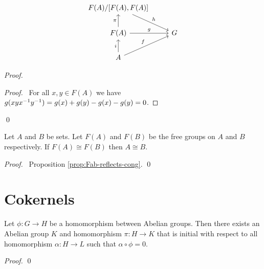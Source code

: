\[ \begin{tikzcd}
F(A)/[F(A),F(A)] \arrow[dr,"h"] \\
F(A) \arrow[r,"g"] \arrow[u,"\pi"] & G \\
A \arrow[u,"i"] \arrow[ur,"f"]
\end{tikzcd} \]

\begin{proof}
\pf
{}
\begin{proof}
	\pf\ For all $x,y \in F(A)$ we have $g(xy{x}^{-1}{y}^{-1}) = g(x) + g(y) - g(x) - g(y) = 0$.
\end{proof}
\qed
\end{proof}

\begin{cor}
Let $A$ and $B$ be sets. Let $F(A)$ and $F(B)$ be the free groups on $A$ and $B$ respectively. If $F(A) \cong F(B)$ then $A \cong B$.
\end{cor}

\begin{proof}
\pf\ Proposition \ref{prop:Fab-reflects-cong}. \qed
\end{proof}

\section{Cokernels}

\begin{prop}
Let $\phi : G \rightarrow H$ be a homomorphism between Abelian groups. Then there exists an Abelian group $K$ and homomorphism $\pi : H \rightarrow K$ that is initial with respect to all homomorphism $\alpha : H \rightarrow L$ such that $\alpha \circ \phi = 0$.
\end{prop}

\begin{proof}
\pf
{}
\qed
\end{proof}

